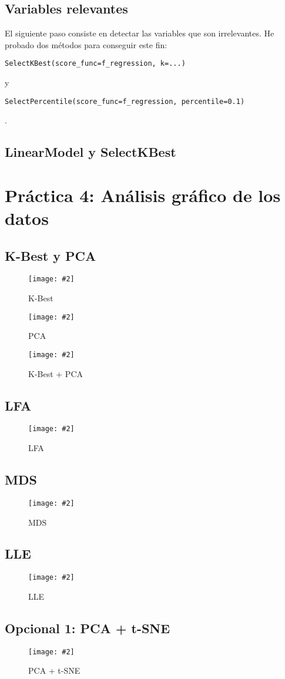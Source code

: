 \documentclass[
12pt, 
spanish, 
singlespacing,
headsepline
]{article}
\newcommand{\image}[2]{
\begin{figure}[H]
	\caption{#1}
	\centering
	\texttt{[image: \#2]}
\end{figure}
}
\newcommand{\code}[1]{\colorbox{light-gray}{\parbox{\dimexpr\linewidth-2\fboxsep}{\strut  \texttt{#1}\strut}}}
\begin{document}
\subsection{Variables relevantes}
El siguiente paso consiste en detectar las variables que son irrelevantes. He probado dos métodos para conseguir este fin: \code{SelectKBest(score_func=f_regression, k=...)} y \code{SelectPercentile(score_func=f_regression, percentile=0.1)}.

\subsection{LinearModel y SelectKBest}

\section{Práctica 4: Análisis gráfico de los datos}
\subsection{K-Best y PCA}
\image{K-Best}{pl4/Figure_1.png}
\image{PCA}{pl4/Figure_2.png}
\image{K-Best + PCA}{pl4/Figure_3.png}
\subsection{LFA}
\image{LFA}{pl4/Figure_4.png}
\subsection{MDS}
\image{MDS}{pl4/Figure_5.png}
\subsection{LLE}
\image{LLE}{pl4/Figure_6.png}
\subsection{Opcional 1: PCA + t-SNE}
\image{PCA + t-SNE}{pl4/Figure_7.png}
\end{document}
